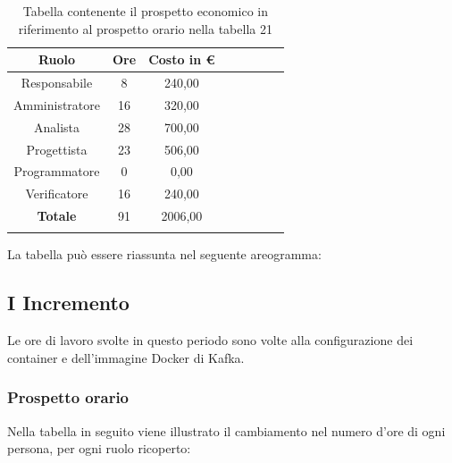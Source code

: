 			\begin{longtable}{|c|c|c|c|c|c|c|c}
				\hline
				\rowcolor{lighter-grayer}
				\textbf{Ruolo} & \textbf{Ore} & \textbf{Costo in €} \\
				\hline
				\endfirsthead
				\hline
			Responsabile 	    & 8 & 240,00\\
			\hline 
			\hline
			Amministratore	  & 16 & 320,00\\
			\hline
			\hline
			Analista 				& 28 & 700,00\\
			\hline
			\hline
			Progettista 		  & 23 & 506,00\\
			\hline
			\hline
			Programmatore 	 & 0 & 0,00\\
			\hline
			\hline
			Verificatore 		  & 16 & 240,00\\
			\hline
			\textbf{Totale} 	& 91 & 2006,00\\
			\hline
				
				\caption{Tabella contenente il prospetto economico in riferimento al prospetto orario nella tabella 21}
			\end{longtable}
			\pagebreak
			
			La tabella può essere riassunta nel seguente areogramma:
				
		
		\subsection{I Incremento}
		Le ore di lavoro svolte in questo periodo sono volte alla configurazione dei container e dell'immagine Docker di Kafka. 
		\subsubsection{Prospetto orario}
			Nella tabella in seguito viene illustrato il cambiamento nel numero d'ore di ogni persona, per ogni ruolo ricoperto:
			
